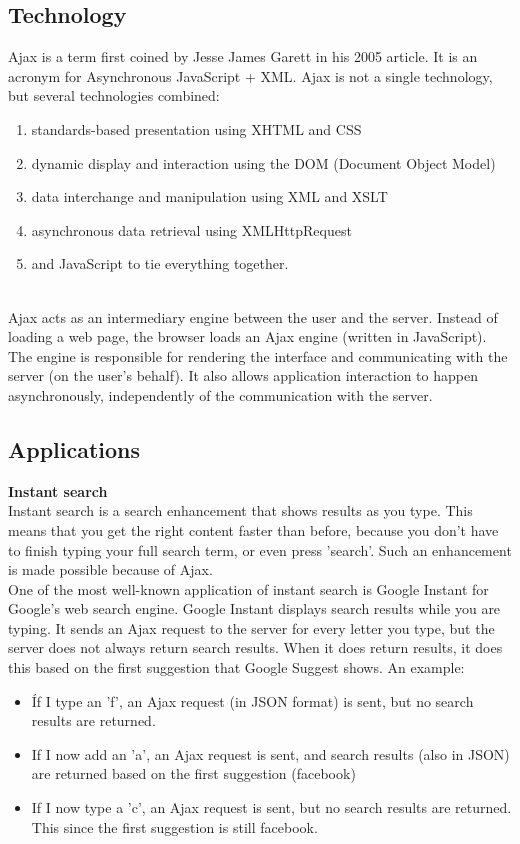 \subsection{Technology}
Ajax is a term first coined by Jesse James Garett in his 2005 article. It is an acronym for Asynchronous JavaScript + XML. Ajax is not a single technology, but several technologies combined:\\
\begin{enumerate}
	\item standards-based presentation using XHTML and CSS
	\item dynamic display and interaction using the DOM (Document Object Model)
	\item data interchange and manipulation using XML and XSLT
	\item asynchronous data retrieval using XMLHttpRequest
	\item and JavaScript to tie everything together.
\end{enumerate} 
~\\
Ajax acts as an intermediary engine between the user and the server. Instead of loading a web page, the browser loads an Ajax engine (written in JavaScript). The engine is responsible for rendering the interface and communicating with the server (on the user's behalf). It also allows application interaction to happen asynchronously, independently of the communication with the server.
	
\subsection{Applications}
		
\textbf{Instant search}\\
Instant search is a search enhancement that shows results as you type. This means that you get the right content faster than before, because you don't have to finish typing your full search term, or even press 'search'. Such an enhancement is made possible because of Ajax.\\
	
One of the most well-known application of instant search is Google Instant for Google's web search engine. Google Instant displays search results while you are typing. It sends an Ajax request to the server for every letter you type, but the server does not always return search results. When it does return results, it does this based on the first suggestion that Google Suggest shows. An example:
\begin{itemize}
	\setlength\itemsep{0em}
	\item Íf I type an 'f', an Ajax request (in JSON format) is sent, but no search results are returned.
	\item If I now add an 'a', an Ajax request is sent, and search results (also in JSON) are returned based on the first suggestion (facebook)
	\item If I now type a 'c', an Ajax request is sent, but no search results are returned. This since the first suggestion is still facebook.
\end{itemize}
	
